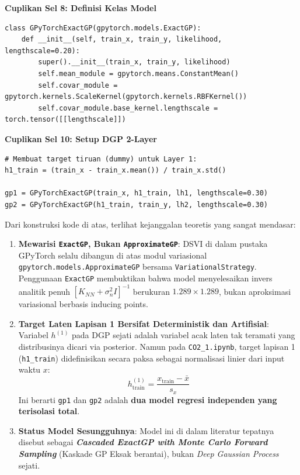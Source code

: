 \documentclass[11pt,a4paper]{article}
\begin{document}
\begin{codebox}
\small
\textbf{Cuplikan Sel 8: Definisi Kelas Model}
\begin{verbatim}
class GPyTorchExactGP(gpytorch.models.ExactGP):
    def __init__(self, train_x, train_y, likelihood, lengthscale=0.20):
        super().__init__(train_x, train_y, likelihood)
        self.mean_module = gpytorch.means.ConstantMean()
        self.covar_module = gpytorch.kernels.ScaleKernel(gpytorch.kernels.RBFKernel())
        self.covar_module.base_kernel.lengthscale = torch.tensor([[lengthscale]])
\end{verbatim}
\end{codebox}

\begin{codebox}
\small
\textbf{Cuplikan Sel 10: Setup DGP 2-Layer}
\begin{verbatim}
# Membuat target tiruan (dummy) untuk Layer 1:
h1_train = (train_x - train_x.mean()) / train_x.std()

gp1 = GPyTorchExactGP(train_x, h1_train, lh1, lengthscale=0.30)
gp2 = GPyTorchExactGP(h1_train, train_y, lh2, lengthscale=0.30)
\end{verbatim}
\end{codebox}

\noindent Dari konstruksi kode di atas, terlihat kejanggalan teoretis yang sangat mendasar:
\begin{enumerate}
    \item \textbf{Mewarisi \texttt{ExactGP}, Bukan \texttt{ApproximateGP}}: DSVI di dalam pustaka GPyTorch selalu dibangun di atas modul variasional \texttt{gpytorch.models.ApproximateGP} bersama \texttt{VariationalStrategy}. Penggunaan \texttt{ExactGP} membuktikan bahwa model menyelesaikan invers analitik penuh $[K_{NN} + \sigma_n^2 I]^{-1}$ berukuran $1.289 \times 1.289$, bukan aproksimasi variasional berbasis inducing points.
    \item \textbf{Target Laten Lapisan 1 Bersifat Deterministik dan Artifisial}: Variabel $h^{(1)}$ pada DGP sejati adalah variabel acak laten tak teramati yang distribusinya dicari via posterior. Namun pada \texttt{CO2\_1.ipynb}, target lapisan 1 (\texttt{h1\_train}) didefinisikan secara paksa sebagai normalisasi linier dari input waktu $x$:
    \begin{equation}
        h_{\mathrm{train}}^{(1)} = \frac{x_{\mathrm{train}} - \bar{x}}{s_x}
    \end{equation}
    Ini berarti \texttt{gp1} dan \texttt{gp2} adalah \textbf{dua model regresi independen yang terisolasi total}.
    \item \textbf{Status Model Sesungguhnya}: Model ini di dalam literatur tepatnya disebut sebagai \textbf{\textit{Cascaded ExactGP with Monte Carlo Forward Sampling}} (Kaskade GP Eksak berantai), bukan \textit{Deep Gaussian Process} sejati.
\end{enumerate}
\end{document}

